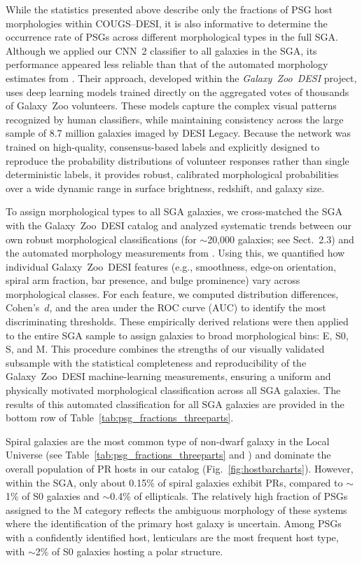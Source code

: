 \documentclass{aa}
\begin{document}
While the statistics presented above describe only the fractions of PSG host morphologies within COUGS–DESI, it is also informative to determine the occurrence rate of PSGs across different morphological types in the full SGA. Although we applied our CNN~2 classifier to all galaxies in the SGA, its performance appeared less reliable than that of the automated morphology estimates from \citet{2023MNRAS.526.4768W}. Their approach, developed within the \textit{Galaxy~Zoo~DESI} project, uses deep learning models trained directly on the aggregated votes of thousands of Galaxy~Zoo volunteers. These models capture the complex visual patterns recognized by human classifiers, while maintaining consistency across the large sample of 8.7 million galaxies imaged by DESI Legacy. Because the network was trained on high-quality, consensus-based labels and explicitly designed to reproduce the probability distributions of volunteer responses rather than single deterministic labels, it provides robust, calibrated morphological probabilities over a wide dynamic range in surface brightness, redshift, and galaxy size.

To assign morphological types to all SGA galaxies, we cross-matched the SGA with the Galaxy~Zoo~DESI catalog and analyzed systematic trends between our own robust morphological classifications (for $\sim$20,000 galaxies; see Sect.~2.3) and the automated morphology measurements from \citet{2023MNRAS.526.4768W}. Using this, we quantified how individual Galaxy~Zoo~DESI features (e.g., smoothness, edge-on orientation, spiral arm fraction, bar presence, and bulge prominence) vary across morphological classes. For each feature, we computed distribution differences, Cohen’s~$d$, and the area under the ROC curve (AUC) to identify the most discriminating thresholds. These empirically derived relations were then applied to the entire SGA sample to assign galaxies to broad morphological bins: E, S0, S, and M. This procedure combines the strengths of our visually validated subsample with the statistical completeness and reproducibility of the Galaxy~Zoo~DESI machine-learning measurements, ensuring a uniform and physically motivated morphological classification across all SGA galaxies. The results of this automated classification for all SGA galaxies are provided in the bottom row of Table~\ref{tab:psg_fractions_threeparts}.

Spiral galaxies are the most common type of non-dwarf galaxy in the Local Universe (see Table~\ref{tab:psg_fractions_threeparts} and \citealt{2006MNRAS.373.1389C}) and dominate the overall population of PR hosts in our catalog (Fig.~\ref{fig:hostbarcharts}). However, within the SGA, only about 0.15\% of spiral galaxies exhibit PRs, compared to $\sim$1\% of S0 galaxies and $\sim$0.4\% of ellipticals. The relatively high fraction of PSGs assigned to the M category reflects the ambiguous morphology of these systems where the identification of the primary host galaxy is uncertain. Among PSGs with a confidently identified host, lenticulars are the most frequent host type, with $\sim$2\% of S0 galaxies hosting a polar structure.  
\end{document}
